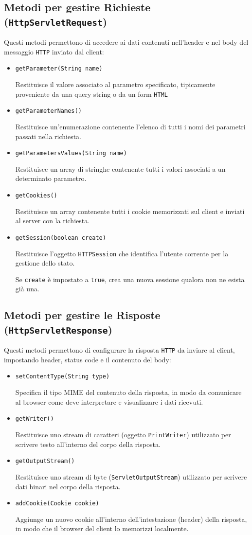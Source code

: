 \subsection{Metodi per gestire Richieste (\texttt{HttpServletRequest})}
Questi metodi permettono di accedere ai dati contenuti nell'header e nel body del messaggio \texttt{HTTP} inviato dal client:
\begin{itemize}
    \item \texttt{getParameter(String name)}

    Restituisce il valore associato al parametro specificato, tipicamente proveniente da una query string o da un form \texttt{HTML}
    \item \texttt{getParameterNames()}

    Restituisce un'enumerazione contenente l'elenco di tutti i nomi dei parametri passati nella richiesta.
    \item \texttt{getParametersValues(String name)}

    Restituisce un array di stringhe contenente tutti i valori associati a un determinato parametro.
    \item \texttt{getCookies()}

    Restituisce un array contenente tutti i cookie memorizzati sul client e inviati al server con la richiesta.
    \item \texttt{getSession(boolean create)}

    Restituisce l'oggetto \texttt{HTTPSession} che identifica l'utente corrente per la gestione dello stato.

    Se \texttt{create} è impostato a \texttt{true}, crea una nuova sessione qualora non ne esista già una.
\end{itemize}
\subsection{Metodi per gestire le Risposte (\texttt{HttpServletResponse})}
Questi metodi permettono di configurare la risposta \texttt{HTTP} da inviare al client, impostando header, status code e il contenuto del body:
\begin{itemize}
    \item \texttt{setContentType(String type)}

    Specifica il tipo MIME del contenuto della risposta, in modo da comunicare al browser come deve interpretare e visualizzare i dati ricevuti.
    \item \texttt{getWriter()}

    Restituisce uno stream di caratteri (oggetto \texttt{PrintWriter}) utilizzato per scrivere testo all'interno del corpo della risposta.
    \item \texttt{getOutputStream()}

    Restituisce uno stream di byte (\texttt{ServletOutputStream}) utilizzato per scrivere dati binari nel corpo della risposta.
    \item \texttt{addCookie(Cookie cookie)}

    Aggiunge un nuovo cookie all'interno dell'intestazione (header) della risposta, in modo che il browser del client lo memorizzi localmente.
\end{itemize}
